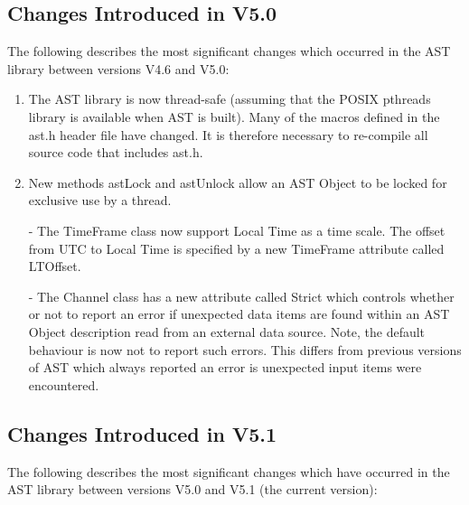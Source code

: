 \documentclass[twoside,11pt]{article}
\newcommand{\xlabel}[1]{}
\begin{document}
\subsection{Changes Introduced in V5.0}

The following describes the most significant changes which 
occurred in the AST library between versions V4.6 and V5.0:

\begin{enumerate}


\item The AST library is now thread-safe (assuming that the POSIX pthreads 
library is available when AST is built). Many of the macros defined in
the ast.h header file have changed. It is therefore necessary to
re-compile all source code that includes ast.h.

\item New methods astLock and astUnlock allow an AST Object to be locked
for exclusive use by a thread.

-  The TimeFrame class now support Local Time as a time scale. The offset
from UTC to Local Time is specified by a new TimeFrame attribute called 
LTOffset.

-  The Channel class has a new attribute called Strict which controls
whether or not to report an error if unexpected data items are found
within an AST Object description read from an external data source. Note,
the default behaviour is now not to report such errors. This differs from
previous versions of AST which always reported an error is unexpected
input items were encountered.

\end{enumerate}

\subsection{\xlabel{changes}\xlabel{list_of_most_recent_changes}Changes
Introduced in V5.1}

The following describes the most significant changes which have
occurred in the AST library between versions V5.0 and V5.1 (the
current version):
\end{document}
